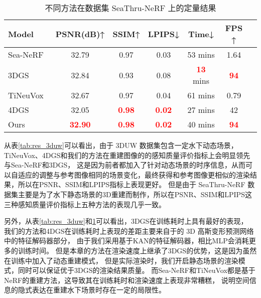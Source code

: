 \begin{table} [htbp]
    \small
    \centering
    \caption{不同方法在数据集 SeaThru-NeRF 上的定量结果}
    \setlength{\tabcolsep}{10pt}
    \begin{tabular}{lcccccc} 
    \toprule
    Model  & PSNR(dB)↑ & SSIM↑ & LPIPS↓ & Time↓ &  FPS ↑  \\ 
    \midrule  
    Sea-NeRF\cite{seathru} & 32.79 & 0.97 & 0.03 & 53 mins & 1.64\\
    3DGS~\cite{3DGS} &32.84 & 0.93 & 0.08&\textcolor{red}{\textbf{13}} mins  &\textcolor{red}{\textbf{94}}\\
    TiNeuVox~\cite{tineuvox}  & 32.67 & 0.97 &  0.04 & 61 mins & 0.79\\ 
    4DGS\cite{4DGS} & 32.05&\textcolor{red}{\textbf{0.98}} &\textcolor{red}{\textbf{0.02}}& 27 mins&42 \\
    Ours & \textcolor{red}{\textbf{32.90}} & \textcolor{red}{\textbf{0.98}} & \textcolor{red}{\textbf{0.02}} & 40 mins & \textcolor{red}{\textbf{94}}\\
    \bottomrule
    \end{tabular}  
    
    \label{tab:res_seanerf}
\end{table}

从表\ref{tab:res_3duw}可以看出，由于 3DUW 数据集包含一定水下动态场景，TiNeuVox\cite{tineuvox}、4DGS\cite{4DGS}和我们的方法在重建图像的的感知质量评价指标上会明显领先与Sea-NeRF\cite{seathru}和3DGS\cite{3DGS}，
这是因为前者都加入了针对动态场景的时序信息，从而可以自适应的调整与参考图像相同的场景变化，最终获得和参考图像更相似的渲染结果，所以在PSNR、SSIM和LPIPS指标上表现更好。
但是由于 SeaThru-NeRF 数据集主要是为了水下静态场景的3D重建而制作，所以在PSNR、SSIM和LPIPS这三种感知质量评价指标上五种方法的表现几乎一致。

另外，从表\ref{tab:res_3duw}和\ref{tab:res_seanerf}可以看出，3DGS\cite{3DGS}在训练耗时上具有最好的表现，
我们的方法和4DGS\cite{4DGS}在训练耗时上表现的差距主要来自于的 3D 高斯变形预测网络中的特征解码器部分，
由于我们采用基于KAN的特征解码器，相比MLP会消耗更多的训练时间。
但是本章的方法在渲染速度上继承了3DGS\cite{3DGS}的优势，这是因为虽然在训练中加入了动态重建模式，
但是实际渲染时，我们开启静态场景的渲染模式，同时可以保证优于3DGS的渲染结果质量。
而Sea-NeRF\cite{seathru}和TiNeuVox\cite{tineuvox}都是基于NeRF的重建方法，这导致其在训练耗时和渲染速度上表现非常糟糕，
说明空间信息的隐式表达在重建水下场景时存在一定的局限性。


